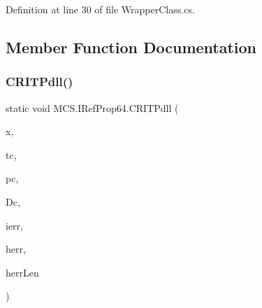 Definition at line 30 of file Wrapper\+Class.\+cs.



\subsection{Member Function Documentation}
\hypertarget{class_m_c_s_1_1_i_ref_prop64_a7310a40e63695fc9e8a8ab9248ed9fc7}{}\label{class_m_c_s_1_1_i_ref_prop64_a7310a40e63695fc9e8a8ab9248ed9fc7} 
\subsubsection{\texorpdfstring{C\+R\+I\+T\+Pdll()}{CRITPdll()}}
{\footnotesize\ttfamily static void M\+C\+S.\+I\+Ref\+Prop64.\+C\+R\+I\+T\+Pdll (\begin{DoxyParamCaption}\item[{\mbox{[}\+Marshal\+As(\+Unmanaged\+Type.\+L\+P\+Array, Size\+Param\+Index=0)\mbox{]} double \mbox{[}$\,$\mbox{]}}]{x,  }\item[{ref double}]{tc,  }\item[{ref double}]{pc,  }\item[{ref double}]{Dc,  }\item[{ref long}]{ierr,  }\item[{\mbox{[}\+Marshal\+As(\+Unmanaged\+Type.\+V\+B\+By\+Ref\+Str)\mbox{]} ref string}]{herr,  }\item[{ref long}]{herr\+Len }\end{DoxyParamCaption})}

\hypertarget{class_m_c_s_1_1_i_ref_prop64_a02ad2205002fb4af7f6bd35722a49d45}{}\label{class_m_c_s_1_1_i_ref_prop64_a02ad2205002fb4af7f6bd35722a49d45} 
